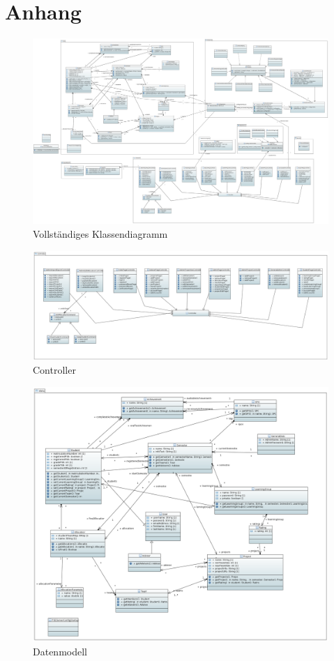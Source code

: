 \documentclass[parskip=full]{scrartcl}
\begin{document}
\section{Anhang}
\pagebreak
\begin{figure}
\centering
\includegraphics[width=\linewidth]{bilder/Class_Diagram.PNG}
\caption{Vollständiges Klassendiagramm}
\label{uml:classDiagram}
\end{figure}

\begin{figure}
\centering
\includegraphics[width=\linewidth]{bilder/controller.png}
\caption{Controller}
\label{uml:controller}
\end{figure}

\begin{figure}[!htb]
\centering
\includegraphics[width=\linewidth]{bilder/daten.png}
\caption{Datenmodell}
\label{uml:data}
\end{figure}
\end{document}
